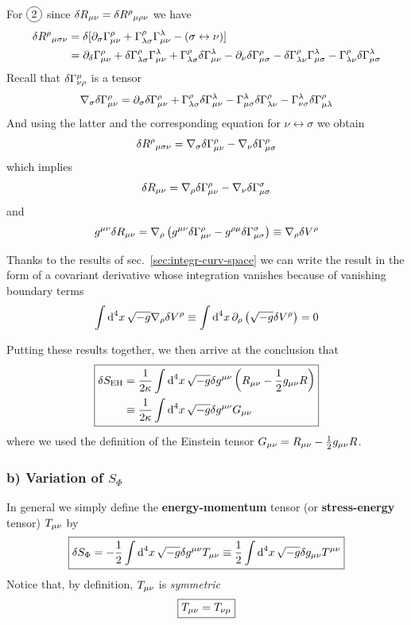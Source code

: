 \documentclass[../main/main.tex]{subfiles}
\begin{document}
For $\circled2$ since $\delta R_{\mu \nu}=\delta{{R}^{\rho}}_{\mu \rho \nu}$ we have
\begin{align*}
\delta{{R}^{\rho}}_{\mu \sigma \nu}&=\delta[\partial_{\sigma}{\Gamma}^{\rho}_{\mu \nu}+{\Gamma}^{\rho}_{\lambda \sigma}{\Gamma}^{\lambda}_{\mu \nu}-(\sigma\leftrightarrow\nu)]\\
&=\partial_{\delta}{\Gamma}^{\rho}_{\mu \nu}+\delta{\Gamma}^{\rho}_{\lambda \sigma}{\Gamma}^{\lambda}_{\mu \nu}+{\Gamma}^{\rho}_{\lambda \sigma}\delta{\Gamma}^{\lambda}_{\mu \nu}-\partial_{\nu}\delta{\Gamma}^{\rho}_{\mu \sigma}-\delta{\Gamma}^{\rho}_{\lambda \nu}{\Gamma}^{\lambda}_{\mu \sigma}-{\Gamma}^{\rho}_{\lambda \nu}\delta{\Gamma}^{\lambda}_{\mu \sigma}
\end{align*}
Recall that $\delta{\Gamma}^{\mu}_{\nu \rho}$ is a tensor
\[\nabla_{\sigma}\delta{\Gamma}^{\rho}_{\mu \nu}=\partial_{\sigma}\delta{\Gamma}^{\rho}_{\mu \nu}+{\Gamma}^{\rho}_{\lambda \sigma}\delta{\Gamma}^{\lambda}_{\mu \nu}-{\Gamma}^{\lambda}_{\mu \sigma}\delta{\Gamma}^{\rho}_{\lambda \nu}-{\Gamma}^{\lambda}_{\nu \sigma}\delta{\Gamma}^{\rho}_{\mu \lambda}\]
And using the latter and the corresponding equation for $\nu\leftrightarrow\sigma$ we obtain
\[\delta{{R}^{\rho}}_{\mu \sigma \nu}=\nabla_{\sigma}\delta{\Gamma}^{\rho}_{\mu \nu}-\nabla_{\nu}\delta{\Gamma}^{\rho}_{\mu \sigma}\]
which implies
\[\delta R_{\mu \nu}=\nabla_{\rho}\delta{\Gamma}^{\rho}_{\mu \nu}-\nabla_{\nu}\delta{\Gamma}^{\sigma}_{\mu \sigma}\]
and
\[g^{\mu \nu}\delta R_{\mu \nu}=\nabla_{\rho}\left(g^{\mu \nu}\delta{\Gamma}^{\rho}_{\mu \nu}-g^{\rho \mu}\delta{\Gamma}^{\sigma}_{\mu \sigma}\right)\equiv\nabla_{\rho}\delta V^\rho\]

Thanks to the results of sec.~\ref{sec:integr-curv-space} we can write the result in the form of a covariant derivative whose integration vanishes because of vanishing boundary terms
\[\int\textup{d}^{4}{x}\,\sqrt{-g}\nabla_{\rho}\delta V^\rho\equiv\int\textup{d}^{4}{x}\,\partial_{\rho}\left(\sqrt{-g}\delta V^\rho\right)=0\]

Putting these results together, we then arrive at the conclusion that 
\begin{equation}\boxed{\begin{split}
\delta S_{\text{EH}}&=\frac1{2\kappa}\int\textup{d}^{4}{x}\,\sqrt{-g}\delta g^{\mu \nu}\left(R_{\mu \nu}-\frac12g_{\mu \nu} R\right)\\
&\equiv\frac1{2\kappa}\int\textup{d}^{4}{x}\,\sqrt{-g}\delta g^{\mu \nu}G_{\mu \nu}
\end{split}}\end{equation}
where we used the definition of the Einstein tensor $G_{\mu \nu}=R_{\mu \nu}-\frac12g_{\mu \nu} R$. 

\subsubsection{b) Variation of $S_\Phi$}

In general we simply define the \textbf{energy-momentum} tensor (or \textbf{stress-energy} tensor) $T_{\mu \nu}$ by
\begin{equation}\boxed{
\delta S_{\Phi}=-\frac12\int\textup{d}^{4}{x}\,\sqrt{-g}\delta g^{\mu \nu}T_{\mu \nu}\equiv\frac12\int\textup{d}^{4}{x}\,\sqrt{-g}\delta g_{\mu \nu}T^{\mu \nu}
}\end{equation}
Notice that, by definition, $T_{\mu \nu}$ is \emph{symmetric}
\begin{equation}\boxed{
T_{\mu \nu}=T_{\nu \mu}
}\end{equation}
\end{document}
